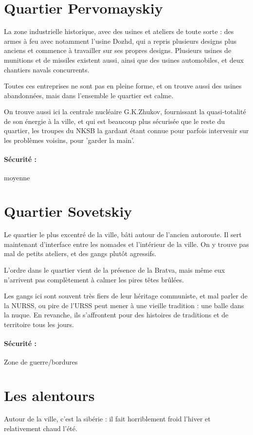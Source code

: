 \documentclass[10pt,a4paper]{book}
\begin{document}
\section{Quartier Pervomayskiy}
La zone industrielle historique, avec des usines et ateliers de toute sorte : des armes à feu avec notamment l'usine Dozhd, qui a repris plusieurs designs plus anciens et commence à travailler sur ses propres designs. Plusieurs usines de munitions et de missiles existent aussi, ainsi que des usines automobiles, et deux chantiers navals concurrents.

Toutes ces entreprises ne sont pas en pleine forme, et on trouve aussi des usines abandonnées, mais dans l'ensemble le quartier est calme.

On trouve aussi ici la centrale nucléaire G.K.Zhukov, fournissant la quasi-totalité de son énergie à la ville, et qui est beaucoup plus sécurisée que le reste du quartier, les troupes du NKSB la gardant étant connue pour parfois intervenir sur les problèmes voisins, pour 'garder la main'.
\paragraph{Sécurité :}moyenne
\section{Quartier Sovetskiy}
Le quartier le plus excentré de la ville, bâti autour de l'ancien autoroute. Il sert maintenant d'interface entre les nomades et l'intérieur de la ville. On y trouve pas mal de petits ateliers, et des gangs plutôt agressifs.

L'ordre dans le quartier vient de la présence de la Bratva, mais même eux n'arrivent pas complètement  à calmer les pires têtes brûlées.

Les gangs ici sont souvent très fiers de leur héritage communiste, et mal parler de la NURSS, ou pire de l'URSS peut mener à une vieille tradition : une balle dans la nuque. En revanche, ils s'affrontent pour des histoires de traditions et de territoire tous les jours.
\paragraph{Sécurité :}Zone de guerre/bordures
\section{Les alentours}
Autour de la ville, c'est la sibérie : il fait horriblement froid l'hiver et relativement chaud l'été.
\end{document}
